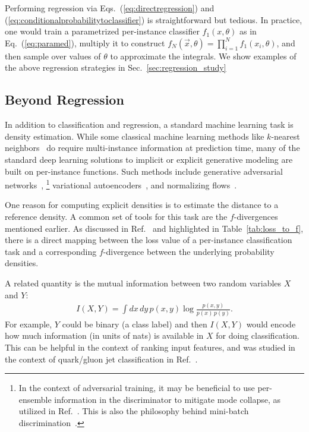\documentclass[aps,prx,reprint,preprintnumbers,superscriptaddress,nofootinbib,longbibliography,floatfix]{revtex4-2}
\DeclareRobustCommand{\Sec}[1]{Sec.~\ref{sec:#1}}
\DeclareRobustCommand{\Tab}[1]{Table~\ref{tab:#1}}
\DeclareRobustCommand{\Eq}[1]{Eq.~(\ref{eq:#1})}
\DeclareRobustCommand{\Eqs}[2]{Eqs.~(\ref{eq:#1}) and (\ref{eq:#2})}
\DeclareRobustCommand{\Ref}[1]{Ref.~\cite{#1}}
\begin{document}
 
Performing regression via \Eqs{directregression}{conditionalprobabilitytoclassifier} is straightforward but tedious.
%
In practice, one would train a parametrized per-instance classifier $f_1(x,\theta)$ as in \Eq{paramed}, multiply it to construct $f_N(\vec{x},\theta)=\prod_{i=1}^N f_1(x_i,\theta)$, and then sample over values of $\theta$ to approximate the integrals.
%
We show examples of the above regression strategies in \Sec{regression_study}







\subsection{Beyond Regression}
\label{sec:beyond}

In addition to classification and regression, a standard machine learning task is density estimation.
%
While some classical machine learning methods like $k$-nearest neighbors~\cite{knn1,knn2} do require multi-instance information at prediction time, many of the standard deep learning solutions to implicit or explicit generative modeling are built on per-instance functions.
%
Such methods include generative adversarial networks~\cite{NIPS2014_5ca3e9b1},%
%
\footnote{
In the context of adversarial training, it may be beneficial to use per-ensemble information in the discriminator to mitigate mode collapse, as utilized in \Ref{Lai:2020byl}.
%
This is also the philosophy behind mini-batch discrimination~\cite{2016arXiv160603498S}.
}
%
variational autoencoders~\cite{kingma2014autoencoding}, and normalizing flows~\cite{pmlr-v37-rezende15}.


One reason for computing explicit densities is to estimate the distance to a reference density.
%
A common set of tools for this task are the $f$-divergences mentioned earlier.
%
As discussed in \Ref{2005math.....10521N} and highlighted in \Tab{loss_to_f}, there is a direct mapping between the loss value of a per-instance classification task and a corresponding $f$-divergence between the underlying probability densities.


A related quantity is the mutual information between two random variables $X$ and $Y$: 
%
\begin{align}
\label{eq:MI}
I(X,Y)=\int dx\, dy\, p(x,y)\log \frac{p(x,y)}{p(x) \, p(y)}.
\end{align}
%
For example, $Y$ could be binary (a class label) and then $I(X,Y)$ would encode how much information (in units of nats) is available in $X$ for doing classification.
%
This can be helpful in the context of ranking input features, and was studied in the context of quark/gluon jet classification in \Ref{Larkoski:2014pca}.
\end{document}
